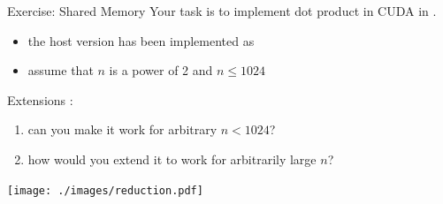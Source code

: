 \begin{frame}[fragile]{Exercise: Shared Memory}
    Your task is to implement dot product in CUDA in .
    \begin{itemize}
        \item the host version has been implemented as 
        \item assume that $n$ is a power of 2 and $n\leq1024$
    \end{itemize}

    Extensions :
    \begin{enumerate}
        \item can you make it work for arbitrary $n<1024$?
        \item how would you extend it to work for arbitrarily large $n$?
    \end{enumerate}

    \centering \texttt{[image: ./images/reduction.pdf]}

\end{frame}
